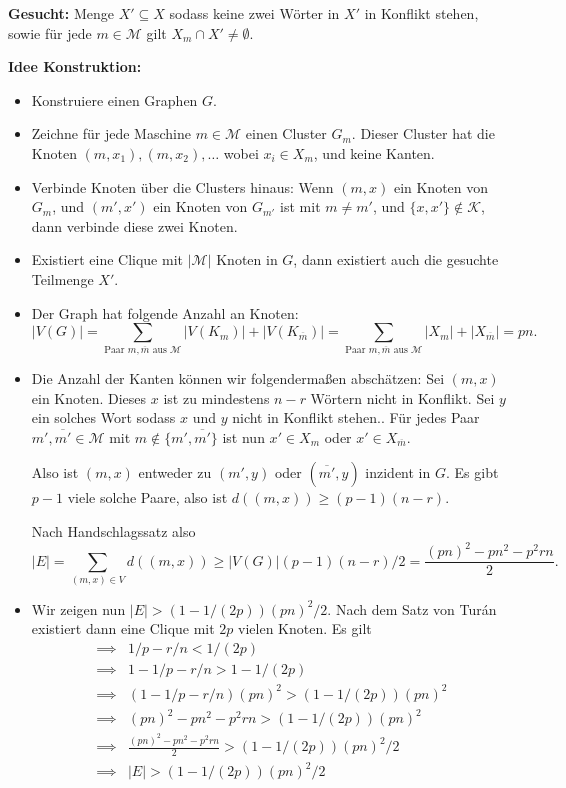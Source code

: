 \documentclass[nofonts]{uebung}
\begin{document}
\noindent
\textbf{Gesucht:} Menge $X'\subseteq X$ sodass keine zwei Wörter in $X'$ in Konflikt stehen, sowie für jede $m\in\mathcal M$ gilt $X_m\cap X' \neq \emptyset$.

\noindent
\textbf{Idee Konstruktion:}
\begin{itemize}
    \item Konstruiere einen Graphen $G$.
    \item Zeichne für jede Maschine $m\in\mathcal M$ einen Cluster $G_m$.
        Dieser Cluster hat die Knoten $(m,x_1), (m,x_2), \dots$ wobei $x_i\in X_m$, und keine Kanten.
    \item Verbinde Knoten über die Clusters hinaus: Wenn $(m,x)$ ein Knoten von $G_m$, und $(m',x')$ ein Knoten von $G_{m'}$ ist mit $m\neq m'$, und $\{x,x'\}\not\in\mathcal K$, dann verbinde diese zwei Knoten. 
    \item Existiert eine Clique mit $|\mathcal{M}|$ Knoten in $G$, dann existiert auch die gesuchte Teilmenge $X'$.
    \item Der Graph hat folgende Anzahl an Knoten:
        \[ |V(G)| = \sum_{\text{Paar $m,\overline{m}$ aus $\mathcal M$}} |V(K_{m})|+|V(K_{\overline{m}})|= \sum_{\text{Paar $m,\overline{m}$ aus $\mathcal M$}} |X_m|+|X_{\overline{m}}| = pn. \]
    \item Die Anzahl der Kanten können wir folgendermaßen abschätzen: Sei $(m,x)$ ein Knoten. Dieses $x$ ist zu mindestens $n-r$ Wörtern nicht in Konflikt.
        Sei $y$ ein solches Wort sodass $x$ und $y$ nicht in Konflikt stehen..
        Für jedes Paar $m', \overline{m'}\in\mathcal M$ mit $m\not\in \{m',\overline{m'}\}$ ist nun $x'\in X_m$ oder $x'\in X_{\overline{m}}$.
        
        Also ist $(m,x)$ entweder zu $(m',y)$ oder $(\overline{m'},y)$ inzident in $G$.
        Es gibt $p-1$ viele solche Paare, also ist $d((m,x))\geq (p-1)(n-r)$.

        Nach Handschlagssatz also
        \[ |E| = \sum_{(m,x)\in V} d((m,x)) \geq |V(G)|(p-1)(n-r)/2 =\frac{(pn)^2-pn^2-p^2rn}{2}. \]
    \item Wir zeigen nun $|E|>(1-1/(2p))(pn)^2/2$. Nach dem Satz von Turán existiert dann eine Clique mit $2p$ vielen Knoten.
        Es gilt
        \begin{align*}
            \implies & 1/p-r/n < 1/(2p)\\
            \implies & 1-1/p-r/n > 1-1/(2p)\\
            \implies & \left(1-1/p-r/n\right){(pn)^2} > (1-1/(2p))(pn)^2\\
            \implies & {(pn)^2-pn^2-p^2rn} > (1-1/(2p))(pn)^2\\
            \implies & \frac{(pn)^2-pn^2-p^2rn}{2} > (1-1/(2p))(pn)^2/2\\
            \implies & |E|>(1-1/(2p))(pn)^2/2
        \end{align*}




\end{itemize}
\end{document}
